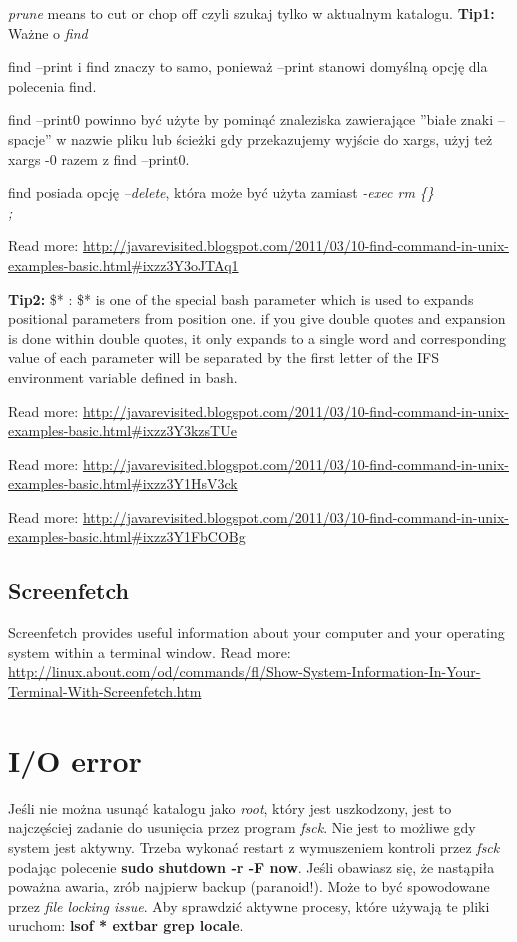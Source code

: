 \documentclass[a4paper,titlepage,12pt]{mwart}
\begin{document}
\textit{prune} means to cut or chop off czyli szukaj tylko w aktualnym katalogu.\newline
\textbf{Tip1:} 
Ważne o \textit{find}\newline
\begin{inparaenum}
\item{find –print i find znaczy to samo, ponieważ –print stanowi domyślną opcję dla polecenia find.}\newline
\item{find –print0 powinno być użyte by pominąć znaleziska zawierające ''białe znaki -- spacje'' w nazwie pliku lub ścieżki gdy przekazujemy wyjście do xargs, użyj też xargs -0 razem z find –print0.}\newline
\item{find posiada opcję \textit{ –delete}, która może być użyta zamiast \textit {-exec rm \{\} \\;}}
\end{inparaenum}
Read more: \url{http://javarevisited.blogspot.com/2011/03/10-find-command-in-unix-examples-basic.html\#ixzz3Y3oJTAq1}


\textbf{Tip2:} 
\$* : \$* is one of the special bash parameter which is used to expands positional parameters from position one.
if you give double quotes and expansion is done within double quotes, it only expands to a single word and corresponding value of each parameter will be separated by the first letter of the IFS environment variable defined in bash.

Read more: \url{http://javarevisited.blogspot.com/2011/03/10-find-command-in-unix-examples-basic.html\#ixzz3Y3kzsTUe}
\fi %

Read more: \url{http://javarevisited.blogspot.com/2011/03/10-find-command-in-unix-examples-basic.html\#ixzz3Y1HsV3ck}

Read more: \url{http://javarevisited.blogspot.com/2011/03/10-find-command-in-unix-examples-basic.html\#ixzz3Y1FbCOBg}

\subsection{Screenfetch}
Screenfetch provides useful information about your computer and your operating system within a terminal window.
Read more: \url{http://linux.about.com/od/commands/fl/Show-System-Information-In-Your-Terminal-With-Screenfetch.htm}
\section{I/O error}
Jeśli nie można usunąć katalogu jako \textit{root}, który jest uszkodzony, jest to najczęściej zadanie do usunięcia przez program \textit{fsck}. Nie jest to możliwe gdy system jest aktywny. Trzeba wykonać restart z wymuszeniem kontroli przez \textit{fsck} podając polecenie \textbf{sudo shutdown -r -F now}. Jeśli obawiasz się, że nastąpiła poważna awaria, zrób najpierw backup (paranoid!).\newline
Może to być spowodowane przez \textit{file locking issue}. Aby sprawdzić aktywne procesy, które używają te pliki uruchom: \textbf{lsof *	extbar grep locale}.
\end{document}
